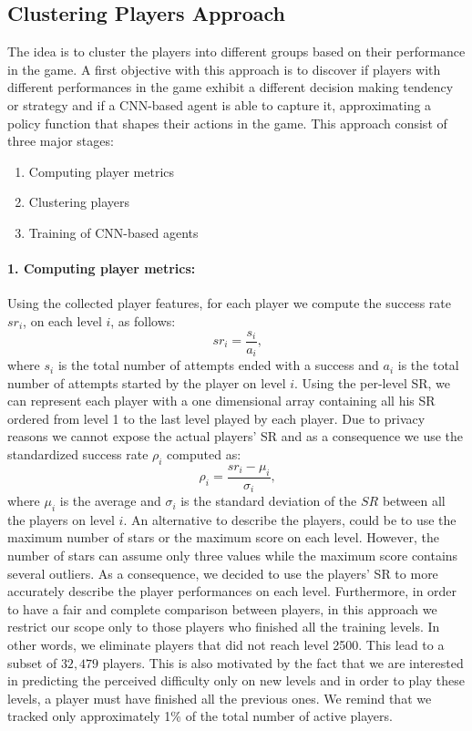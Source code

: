 \subsection{Clustering Players Approach}
The idea is to cluster the players into different groups based on their performance in the game. A first objective with this approach is to discover if players with different performances in the game exhibit a different decision making tendency or strategy and if a \acs{CNN}-based agent is able to capture it, approximating a policy function that shapes their actions in the game. This approach consist of three major stages:
\begin{enumerate}
    \item Computing player metrics
    \item Clustering players
    \item Training of \acs{CNN}-based agents
\end{enumerate}

\paragraph{1. Computing player metrics:}
Using the collected player features, for each player we compute the success rate $sr_i$, on each level $i$, as follows:
\begin{equation}\label{sucess_rate_i}
      sr_i  = \frac{s_i}{a_i} \text{,}
\end{equation}
where $s_i$ is the total number of attempts ended with a success and $a_i$ is the total number of attempts started by the player on level $i$. 
Using the per-level SR, we can represent each player with a one dimensional array containing all his SR ordered from level 1 to the last level played by each player. Due to privacy reasons we cannot expose the actual players' SR and as a consequence we use the standardized success rate $\rho_i$ computed as:
\begin{equation}\label{standardized_sr}
       \rho_{i}  = \frac{sr_i - \mu_i }{\sigma_i} \text{,}
\end{equation}
where $\mu_i$ is the average and $\sigma_i$ is the standard deviation of the $SR$ between all the players on level $i$.
An alternative to describe the players, could be to use the maximum number of stars or the maximum score on each level. However, the number of stars can assume only three values while the maximum score contains several outliers. As a consequence, we decided to use the players' SR to more accurately describe the player performances on each level.
Furthermore, in order to have a fair and complete comparison between players, in this approach we restrict our scope only to those players who finished all the training levels. In other words, we eliminate players that did not reach level 2500. This lead to a subset of $32,479$ players. This is also motivated by the fact that we are interested in predicting the perceived difficulty only on new levels and in order to play these levels, a player must have finished all the previous ones. We remind that we tracked only approximately 1\% of the total number of active players.

